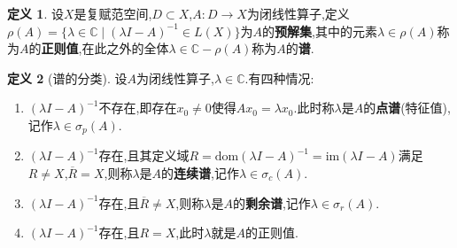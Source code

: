\documentclass{ctexart}
\theoremstyle{definition}
\newtheorem{definition}{定义}
\theoremstyle{remark}
\begin{document}
	\begin{definition}
		设$X$是复赋范空间,$D\subset X$,$A:D\to X$为闭线性算子,定义$\rho(A)=\{\lambda\in\mathbb{C}\mid(\lambda I-A)^{-1}\in L(X)\}$为$A$的\textbf{预解集},其中的元素$\lambda\in\rho(A)$称为$A$的\textbf{正则值},在此之外的全体$\lambda\in\mathbb{C}-\rho(A)$称为$A$的\textbf{谱}.
	\end{definition}
	\begin{definition}[谱的分类]
		设$A$为闭线性算子,$\lambda\in\mathbb{C}$.有四种情况:
		\begin{enumerate}
			\item $(\lambda I-A)^{-1}$不存在,即存在$x_0\ne 0$使得$Ax_0=\lambda x_0$.此时称$\lambda$是$A$的\textbf{点谱}(特征值),记作$\lambda\in\sigma_p(A)$.
			\item $(\lambda I-A)^{-1}$存在,且其定义域$R=\mathrm{dom}(\lambda I-A)^{-1}=\mathrm{im}(\lambda I-A)$满足$R\ne X$,$\overline{R}=X$,则称$\lambda$是$A$的\textbf{连续谱},记作$\lambda\in\sigma_c(A)$.
			\item $(\lambda I-A)^{-1}$存在,且$\overline{R}\ne X$,则称$\lambda$是$A$的\textbf{剩余谱},记作$\lambda\in\sigma_r(A)$.
			\item $(\lambda I-A)^{-1}$存在,且$R=X$,此时$\lambda$就是$A$的正则值.
		\end{enumerate}
	\end{definition}
	
\end{document}
